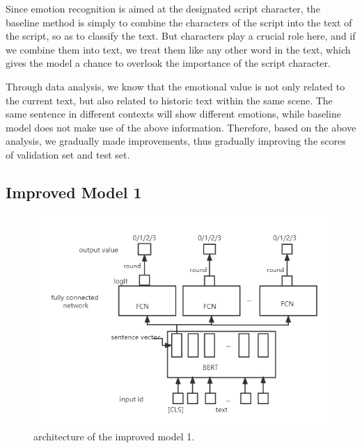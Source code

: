 \documentclass[12pt,twocolumn,letterpaper]{article}
\begin{document}
Since emotion recognition is aimed at the designated script character, the baseline method is simply to combine the characters of the script into the text of the script, so as to classify the text. But characters play a crucial role here, and if we combine them into text, we treat them like any other word in the text, which gives the model a chance to overlook the importance of the script character.  

Through data analysis, we know that the emotional value is not only related to the current text, but also related to historic text within the same scene. The same sentence in different contexts will show different emotions, while baseline model does not make use of the above information.  
Therefore, based on the above analysis, we gradually made improvements, thus gradually improving the scores of validation set and test set.    


\subsection{Improved Model 1}
\begin{figure}
\begin{center}
\includegraphics[scale=0.5]{Method2.png}
\end{center}
   \caption{architecture of the improved model 1.}
\label{fig:short}
\end{figure}
\end{document}
